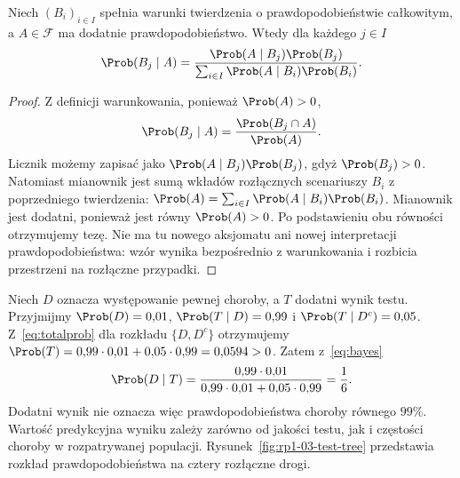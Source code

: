 \begin{twierdzenie}
Niech $(B_i)_{i\in I}$ spełnia warunki twierdzenia
o prawdopodobieństwie całkowitym,
a $A\in\mathcal F$ ma dodatnie prawdopodobieństwo.
Wtedy dla każdego $j\in I$
\begin{equation}\label{eq:bayes}
\Prob(B_j\mid A)
=\frac{\Prob(A\mid B_j)\Prob(B_j)}
{\sum_{i\in I}\Prob(A\mid B_i)\Prob(B_i)}.
\end{equation}
\end{twierdzenie}
\begin{proof}
Z definicji warunkowania, ponieważ $\Prob(A)>0$,
\[
\Prob(B_j\mid A)=\frac{\Prob(B_j\cap A)}{\Prob(A)}.
\]
Licznik możemy zapisać jako
$\Prob(A\mid B_j)\Prob(B_j)$, gdyż $\Prob(B_j)>0$.
Natomiast mianownik jest sumą wkładów rozłącznych
scenariuszy $B_i$ z poprzedniego twierdzenia:
$\Prob(A)=\sum_{i\in I}\Prob(A\mid B_i)\Prob(B_i)$.
Mianownik jest dodatni, ponieważ jest równy $\Prob(A)>0$.
Po podstawieniu obu równości otrzymujemy tezę.
Nie ma tu nowego aksjomatu ani nowej interpretacji
prawdopodobieństwa: wzór wynika bezpośrednio z
warunkowania i rozbicia przestrzeni na rozłączne przypadki.
\end{proof}

\begin{przyklad}
Niech $D$ oznacza występowanie pewnej choroby, a $T$ dodatni wynik
testu. Przyjmijmy $\Prob(D)=0{,}01$,
$\Prob(T\mid D)=0{,}99$ i $\Prob(T\mid D^c)=0{,}05$.
Z~\eqref{eq:totalprob} dla rozkładu $\{D,D^c\}$
otrzymujemy $\Prob(T)=0{,}99\cdot0{,}01+0{,}05\cdot0{,}99
=0{,}0594>0$. Zatem z~\eqref{eq:bayes}
\[
\Prob(D\mid T)
=\frac{0{,}99\cdot0{,}01}
{0{,}99\cdot0{,}01+0{,}05\cdot0{,}99}
=\frac16.
\]
Dodatni wynik nie oznacza więc prawdopodobieństwa choroby równego
$99\%$. Wartość predykcyjna wyniku zależy zarówno od jakości testu,
jak i częstości choroby w rozpatrywanej populacji.
Rysunek~\ref{fig:rp1-03-test-tree} przedstawia rozkład prawdopodobieństwa na cztery rozłączne drogi.
\end{przyklad}

